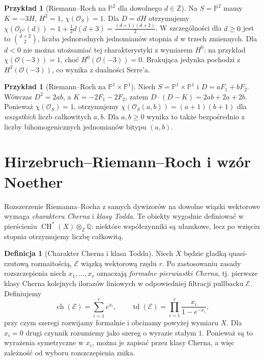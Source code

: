 \documentclass[11pt,a4paper,openany]{report}
\numberwithin{equation}{section}
\theoremstyle{plain}
\theoremstyle{definition}
\newtheorem{definicja}[twierdzenie]{Definicja}
\newtheorem{przyklad}[twierdzenie]{Przykład}
\theoremstyle{remark}
\newcommand{\Z}{\mathbb Z}
\newcommand{\Q}{\mathbb Q}
\newcommand{\PP}{\mathbb P}
\begin{document}
\begin{przyklad}[Riemann--Roch na $\PP^2$ dla dowolnego $d\in\Z$]
\label{prz:ga7-rr-p2}
Na $S=\PP^2$ mamy $K=-3H$, $H^2=1$,
$\chi(\mathcal O_S)=1$. Dla $D=dH$ otrzymujemy
$\chi(\mathcal O_{\PP^2}(d))=1+\frac12d(d+3)
=\frac{(d+1)(d+2)}2$.
W szczególności dla $d\ge0$ jest to
$\binom{d+2}{2}$, liczba jednorodnych jednomianów
stopnia $d$ w trzech zmiennych.
Dla $d<0$ nie można utożsamiać tej charakterystyki
z wymiarem $H^0$: na przykład
$\chi(\mathcal O(-3))=1$, choć $H^0(\mathcal O(-3))=0$.
Brakująca jedynka pochodzi z $H^2(\mathcal O(-3))$,
co wynika z dualności Serre'a.
\end{przyklad}

\begin{przyklad}[Riemann--Roch na $\PP^1\times\PP^1$]
Niech $S=\PP^1\times\PP^1$ i
$D=aF_1+bF_2$. Wówczas $D^2=2ab$, a
$K=-2F_1-2F_2$, zatem
$D\cdot(D-K)=2ab+2a+2b$.
Ponieważ $\chi(\mathcal O_S)=1$,
otrzymujemy
$\chi(\mathcal O_S(a,b))=(a+1)(b+1)$
dla \emph{wszystkich} liczb całkowitych $a,b$.
Dla $a,b\ge0$ wynika to także bezpośrednio z liczby
bihomogenicznych jednomianów bitypu $(a,b)$.
\end{przyklad}

\section{Hirzebruch--Riemann--Roch i wzór Noether}
\label{sec:ga7-noether}

Rozszerzenie Riemanna--Rocha z samych dywizorów
na dowolne wiązki wektorowe wymaga \emph{charakteru Cherna}
i \emph{klasy Todda}. Te obiekty wygodnie definiować
w pierścieniu $\operatorname{CH}^*(X)\otimes_\Z\Q$:
niektóre współczynniki są ułamkowe, lecz po wzięciu
stopnia otrzymujemy liczbę całkowitą.

\begin{definicja}[Charakter Cherna i klasa Todda]
\label{def:ga7-ch-td}
Niech $X$ będzie gładką quasi-rzutową rozmaitością,
$\mathcal E$ wiązką wektorową rzędu $r$.
Po zastosowaniu zasady rozszczepienia niech
$x_1,\ldots,x_r$ oznaczają \emph{formalne pierwiastki Cherna},
tj. pierwsze klasy Cherna kolejnych ilorazów liniowych
w odpowiedniej filtracji pullbacku $\mathcal E$.
Definiujemy
\[
\operatorname{ch}(\mathcal E)=\sum_{i=1}^r e^{x_i},
\qquad
\operatorname{td}(\mathcal E)=\prod_{i=1}^r
\frac{x_i}{1-e^{-x_i}},
\]
przy czym szeregi rozwijamy formalnie i obcinamy
powyżej wymiaru $X$. Dla $x_i=0$ drugi czynnik
rozumiemy jako szereg o wyrazie stałym $1$.
Ponieważ są to wyrażenia symetryczne w $x_i$,
można je zapisać przez klasy Cherna, a więc
zależność od wyboru rozszczepienia znika.
\end{definicja}
\end{document}
